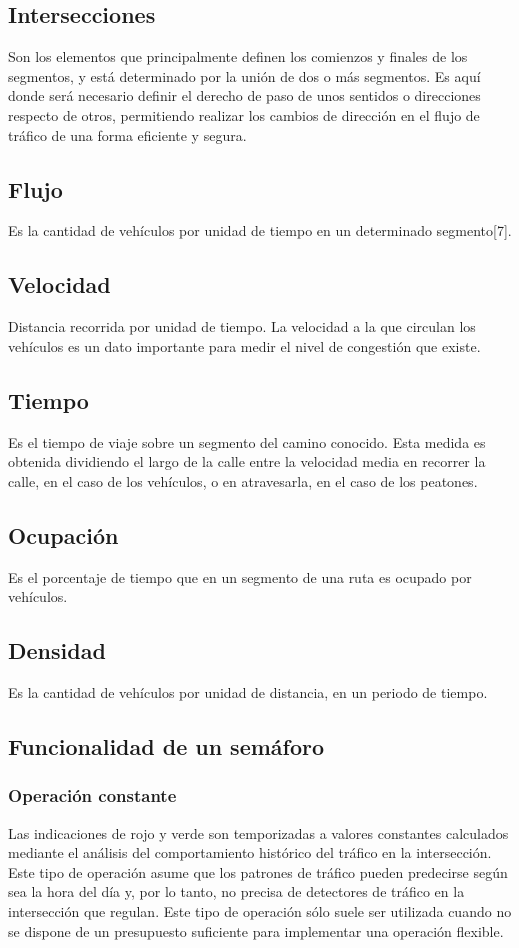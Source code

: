 \subsection{Intersecciones}
Son los elementos que principalmente definen los comienzos y finales de los segmentos, y está determinado 
por la unión de dos o más segmentos. Es aquí donde será necesario definir el derecho de paso de unos sentidos 
o direcciones respecto de otros, permitiendo realizar los cambios de dirección en el flujo de tráfico de una 
forma eficiente y segura\cite{7}.
\subsection{Flujo}
Es la cantidad de vehículos por unidad de tiempo en un determinado segmento[7].
\subsection{Velocidad}
Distancia recorrida por unidad de tiempo. La velocidad a la que circulan los vehículos es un dato importante 
para medir el nivel de congestión que existe\cite{7}.
\subsection{Tiempo}
Es el tiempo de viaje sobre un segmento del camino conocido. Esta medida es obtenida dividiendo el largo de 
la calle entre la velocidad media en recorrer la calle, en el caso de los vehículos, o en atravesarla, en el 
caso de los peatones\cite{7}.
\subsection{Ocupación}
Es el porcentaje de tiempo que en un segmento de una ruta es ocupado por vehículos\cite{7}.
\subsection{Densidad}
Es la cantidad de vehículos por unidad de distancia, en un periodo de tiempo\cite{7}.
\subsection{Funcionalidad de un semáforo}
\subsubsection{Operación constante}
Las indicaciones de rojo y verde son temporizadas a valores constantes calculados mediante el análisis del 
comportamiento histórico del tráfico en la intersección. Este tipo de operación asume que los patrones de 
tráfico pueden predecirse según sea la hora del día y, por lo tanto, no precisa de detectores de tráfico en 
la intersección que regulan. Este tipo de operación sólo suele ser utilizada cuando no se dispone de un presupuesto 
suficiente para implementar una operación flexible\cite{19}.
